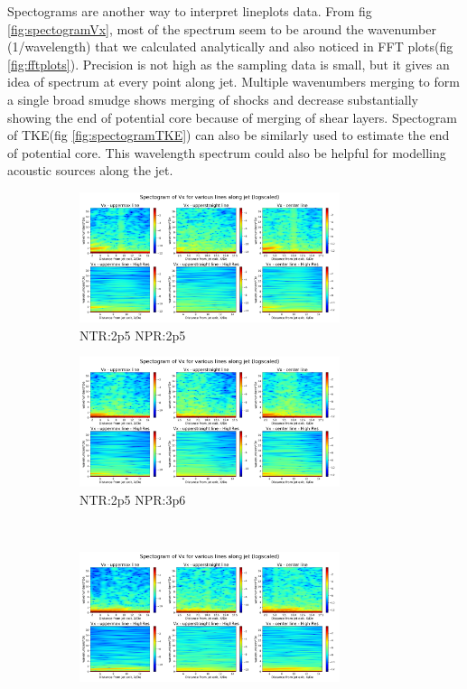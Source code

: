 Spectograms are another way to interpret lineplots data. From fig \ref{fig:spectogramVx}, most of the spectrum seem to be around the wavenumber (1/wavelength) that we calculated analytically and also noticed in FFT plots(fig \ref{fig:fftplots}). Precision is not high as the sampling data is small, but it gives an idea of spectrum at every point along jet. Multiple wavenumbers merging to form a single broad smudge shows merging of shocks and decrease substantially showing the end of potential core because of merging of shear layers. Spectogram of TKE(fig \ref{fig:spectogramTKE}) can also be similarly used to estimate the end of potential core. This wavelength spectrum could also be helpful for modelling acoustic sources along the jet. \\ 

\begin{figure}[H]
\begin{subfigure}{0.5\textwidth}
	\centering
	\includegraphics[width=3in]{images/Spectogram_Vx_NTR2p5_NPR2p5.png}
	\caption{NTR:2p5 NPR:2p5 }
	\label{fig:setup1}
\end{subfigure}%
\begin{subfigure}{0.5\textwidth}
	\centering
	\includegraphics[width=3in]{images/Spectogram_Vx_NTR2p5_NPR3p0.png}
	\caption{NTR:2p5 NPR:3p6 }
	\label{fig:setup2}
\end{subfigure}\\
\begin{subfigure}{0.5\textwidth}
	\centering
	\includegraphics[width=3in]{images/Spectogram_Vx_NTR2p5_NPR3p6.png}

\end{subfigure}
\end{figure}
